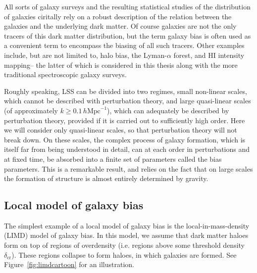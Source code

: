 All sorts of galaxy surveys and the resulting statistical studies of the distribution of galaxies ciritally rely on a robust description of the relation between the galaxies and the underlying dark matter. Of course galaxies are not the only tracers of this dark matter distribution, but the term galaxy bias is often used as a convenient term to encompass the biasing of all such tracers. Other examples include, but are not limited to, halo bias, the Lyman-$\alpha$ forest, and HI intensity mapping-- the latter of which is considered in this thesis along with the more traditional spectroscopic galaxy surveys. 

Roughly speaking, LSS can be divided into two regimes, small non-linear scales, which cannot be described with perturbation theory, and large quasi-linear scales (of approximately $k \geq 0.1\,h\mathrm{Mpc}^{-1}$), which can adequately be described by perturbation theory, provided if it is carried out to sufficiently high order. Here we will consider only quasi-linear scales, so that perturbation theory will not break down. On these scales, the complex process of galaxy formation, which is itself far from being understood in detail, can at each order in perturbations and at fixed time, be absorbed into a finite set of parameters called the bias parameters. This is a remarkable result, and relies on the fact that on large scales the formation of structure is almost entirely determined by gravity. 

\subsection{Local model of galaxy bias}

The simplest example of a local model of galaxy bias is the local-in-mass-density (LIMD) model of galaxy bias. In this model, we assume that dark matter haloes form on top of regions of overdensity (i.e. regions above some threshold density $\delta_\mathrm{cr}$). These regions collapse to form haloes, in which galaxies are formed. See Figure~\ref{fig:limdcartoon} for an illustration. 

